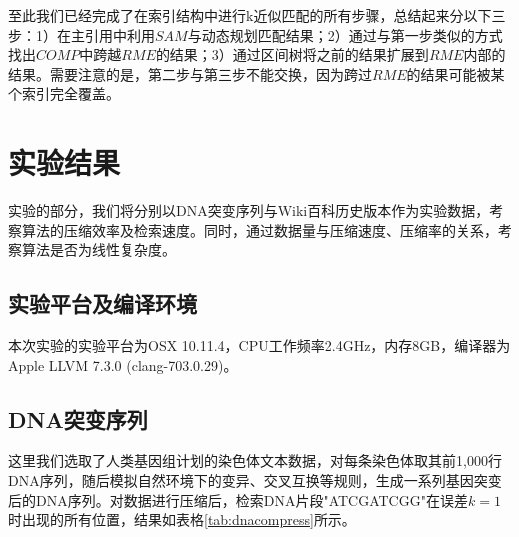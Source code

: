 ﻿\documentclass{sysuthesis}
\begin{document}
至此我们已经完成了在索引结构中进行k近似匹配的所有步骤，总结起来分以下三步：1）在主引用中利用$SAM$与动态规划匹配结果；2）通过与第一步类似的方式找出$COMP$中跨越$RME$的结果；3）通过区间树将之前的结果扩展到$RME$内部的结果。需要注意的是，第二步与第三步不能交换，因为跨过$RME$的结果可能被某个索引完全覆盖。



\chapter{实验结果}
实验的部分，我们将分别以DNA突变序列与Wiki百科历史版本作为实验数据，考察算法的压缩效率及检索速度。同时，通过数据量与压缩速度、压缩率的关系，考察算法是否为线性复杂度。



\section{实验平台及编译环境}
本次实验的实验平台为OSX 10.11.4，CPU工作频率2.4GHz，内存8GB，编译器为Apple LLVM 7.3.0 (clang-703.0.29)。



\section{DNA突变序列}
这里我们选取了人类基因组计划的染色体文本数据，对每条染色体取其前1,000行DNA序列，随后模拟自然环境下的变异、交叉互换等规则，生成一系列基因突变后的DNA序列。对数据进行压缩后，检索DNA片段"ATCGATCGG"在误差$k = 1$时出现的所有位置，结果如表格\ref{tab:dnacompress}所示。\par
\end{document}
